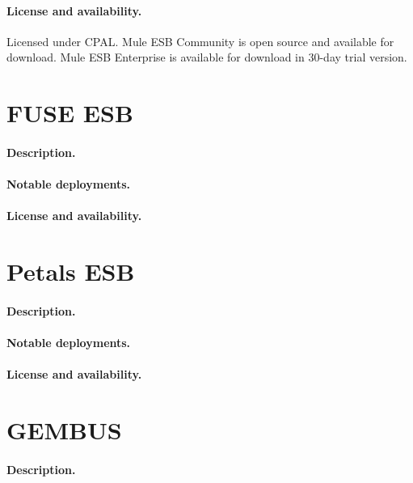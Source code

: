 \documentclass[a4paper]{report}
\begin{document}
\paragraph{License and availability.}
Licensed under CPAL. Mule ESB Community is open source and available for download. Mule ESB Enterprise is available for download in 30-day trial version.



\section{FUSE ESB}

\paragraph{Description.}

\paragraph{Notable deployments.}

\paragraph{License and availability.}



\section{Petals ESB}

\paragraph{Description.}

\paragraph{Notable deployments.}

\paragraph{License and availability.}


\section{GEMBUS}

\paragraph{Description.}
\end{document}
